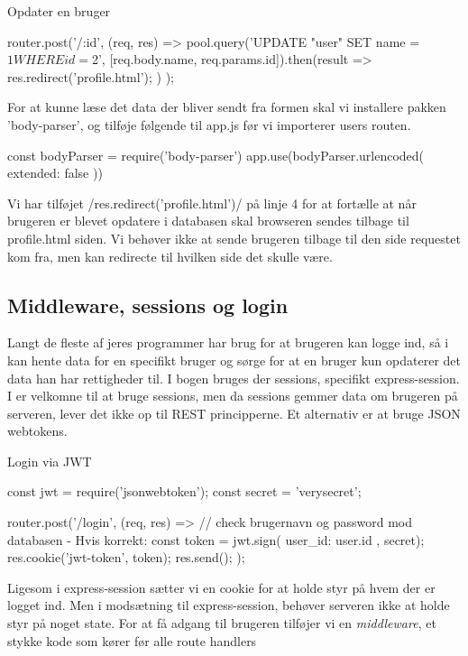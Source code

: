 \documentclass[english,course]{lecture}
\begin{document}
\begin{listing}[H]
\caption{Opdater en bruger}
\begin{jscode}
router.post('/:id', (req, res) => {
	pool.query('UPDATE "user" SET name = $1 WHERE id = $2', [req.body.name, req.params.id]).then(result => {
		res.redirect('profile.html');
	})
});
\end{jscode}
\end{listing}

For at kunne læse det data der bliver sendt fra formen skal vi installere pakken 'body-parser', og tilføje følgende til app.js før vi importerer users routen.

\begin{jscode}
const bodyParser = require('body-parser')
app.use(bodyParser.urlencoded({ extended: false }))
\end{jscode}

Vi har tilføjet \jsinline/res.redirect('profile.html')/ på linje 4 for at fortælle at når brugeren er blevet opdatere i databasen skal browseren sendes tilbage til profile.html siden. Vi behøver ikke at sende brugeren tilbage til den side requestet kom fra, men kan redirecte til hvilken side det skulle være.

\subsection{Middleware, sessions og login}

Langt de fleste af jeres programmer har brug for at brugeren kan logge ind, så i kan hente data for en specifikt bruger og sørge for at en bruger kun opdaterer det data han har rettigheder til. I bogen bruges der sessions, specifikt express-session. I er velkomne til at bruge sessions, men da sessions gemmer data om brugeren på serveren, lever det ikke op til REST principperne. Et alternativ er at bruge JSON webtokens.

\begin{listing}[H]
\caption{Login via JWT}
\begin{jscode}
const jwt = require('jsonwebtoken');
const secret = 'verysecret';

router.post('/login', (req, res) => {
	// check brugernavn og password mod databasen - Hvis korrekt:
	const token = jwt.sign({ user_id: user.id }, secret);
	res.cookie('jwt-token', token);
	res.send();
});
\end{jscode}
\end{listing}

Ligesom i express-session sætter vi en cookie for at holde styr på hvem der er logget ind. Men i modsætning til express-session, behøver serveren ikke at holde styr på noget state. For at få adgang til brugeren tilføjer vi en \textit{middleware}, et stykke kode som kører før alle route handlers
\end{document}
